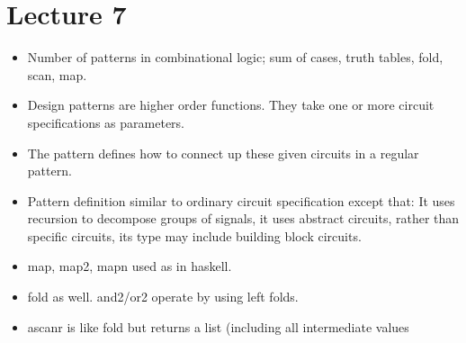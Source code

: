 \documentclass{article}
\begin{document}
\section*{Lecture 7}
\begin{itemize}
\item Number of patterns in combinational logic; sum of cases, truth tables, fold, scan, map.
\item Design patterns are higher order functions. They take one or more circuit specifications as parameters.
\item The pattern defines how to connect up these given circuits in a regular pattern.
\item Pattern definition similar to ordinary circuit specification except that: It uses recursion to decompose groups of signals, it uses abstract circuits, rather than specific circuits, its type may include building block circuits.
\item map, map2, mapn used as in haskell.
\item fold as well. and2/or2 operate by using left folds.
\item ascanr is like fold but returns a list (including all intermediate values

\end{itemize}
\end{document}
